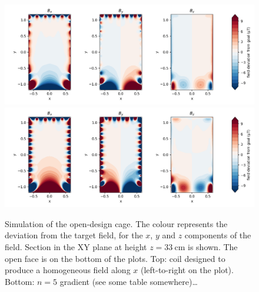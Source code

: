 \begin{figure}
  \centering
  \includegraphics[width=\linewidth]{gfx/prototype/open_design_Xcoil_field_XY_z0_33.png}
  \includegraphics[width=\linewidth]{gfx/prototype/open_design_n5coil_field_XY_z0_33.png}
  \caption{Simulation of the open-design cage. The colour represents the deviation from the target field, for the $x$, $y$ and $z$ components of the field. Section in the XY plane at height $z=\SI{33}{\centi\meter}$ is shown. The open face is on the bottom of the plots. Top: coil designed to produce a homogeneous field along $x$ (left-to-right on the plot). Bottom: $n=5$ gradient (see some table somewhere)\ldots}\label{fig:prototype_open_design_simulation}
\end{figure}

